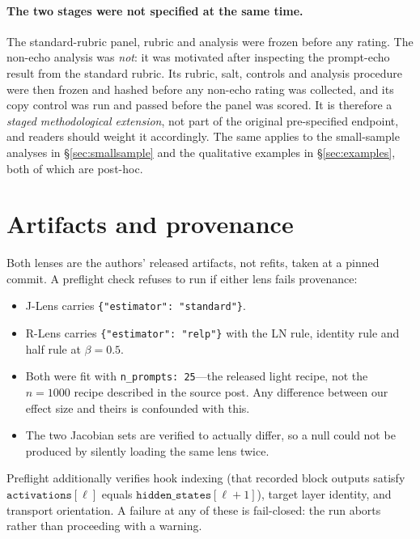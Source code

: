 \documentclass[11pt]{article}
\newcommand{\flag}[1]{\textcolor{flagged}{#1}}
\begin{document}
\paragraph{\flag{The two stages were not specified at the same time.}} The
standard-rubric panel, rubric and analysis were frozen before any rating. The
non-echo analysis was \emph{not}: it was motivated after inspecting the
prompt-echo result from the standard rubric. Its rubric, salt, controls and
analysis procedure were then frozen and hashed before any non-echo rating was
collected, and its copy control was run and passed before the panel was scored.
It is therefore a \emph{staged methodological extension}, not part of the
original pre-specified endpoint, and readers should weight it accordingly. The
same applies to the small-sample analyses in \S\ref{sec:smallsample} and the
qualitative examples in \S\ref{sec:examples}, both of which are post-hoc.

\section{Artifacts and provenance}

Both lenses are the authors' released artifacts, not refits, taken at a pinned
commit. A preflight check refuses to run if either lens fails provenance:

\begin{itemize}
\item J-Lens carries \texttt{\{"estimator": "standard"\}}.
\item R-Lens carries \texttt{\{"estimator": "relp"\}} with the LN rule,
      identity rule and half rule at $\beta = 0.5$.
\item \flag{Both were fit with \texttt{n\_prompts: 25}}---the released light
      recipe, not the $n = 1000$ recipe described in the source post. Any
      difference between our effect size and theirs is confounded with this.
\item The two Jacobian sets are verified to actually differ, so a null could
      not be produced by silently loading the same lens twice.
\end{itemize}

Preflight additionally verifies hook indexing (that recorded block outputs
satisfy $\texttt{activations}[\ell]$ equals $\texttt{hidden\_states}[\ell{+}1]$),
target layer identity, and transport orientation. A failure at any of these is
fail-closed: the run aborts rather than proceeding with a warning.
\end{document}
